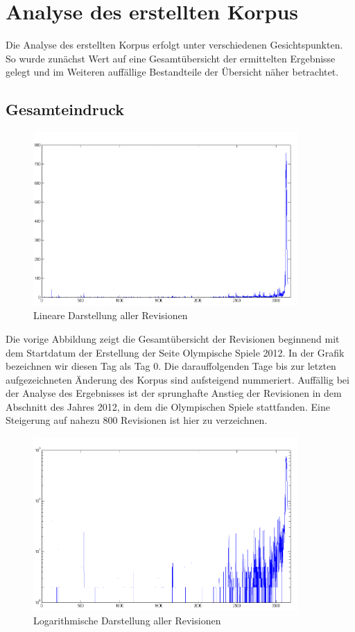 \documentclass[pagesize=auto, titlepage=on]{scrartcl}
\begin{document}
\section{Analyse des erstellten Korpus}
\label{sec:evaluation}

Die Analyse des erstellten Korpus erfolgt unter verschiedenen Gesichtspunkten. So wurde zunächst Wert auf eine Gesamtübersicht der ermittelten Ergebnisse gelegt und im Weiteren auffällige Bestandteile der Übersicht näher betrachtet.
\subsection{Gesamteindruck}
\begin{figure}[htb]
  \centering
     \includegraphics*[width=0.9\textwidth]{images/linearkomplett.png}
   \caption[Alle Revisionen linear]{Lineare Darstellung aller Revisionen}
   \label{fig:nag_conf}
\end{figure}
Die vorige Abbildung zeigt die Gesamtübersicht der Revisionen beginnend mit dem Startdatum der Erstellung der Seite Olympische Spiele 2012. In der Grafik bezeichnen wir diesen Tag als Tag 0. Die darauffolgenden Tage bis zur letzten aufgezeichneten Änderung des Korpus sind aufsteigend nummeriert. Auffällig bei der Analyse des Ergebnisses ist der sprunghafte Anstieg der Revisionen in dem Abschnitt des Jahres 2012, in dem die Olympischen Spiele stattfanden. Eine Steigerung auf nahezu 800 Revisionen ist hier zu verzeichnen.
\clearpage
\begin{figure}[htb]
  \centering
     \includegraphics*[width=0.9\textwidth]{images/linearlogkomplett.png}
   \caption[Alle Revisionen logarithmisch]{Logarithmische Darstellung aller Revisionen}
   \label{fig:nag_conf}
\end{figure}
\end{document}

